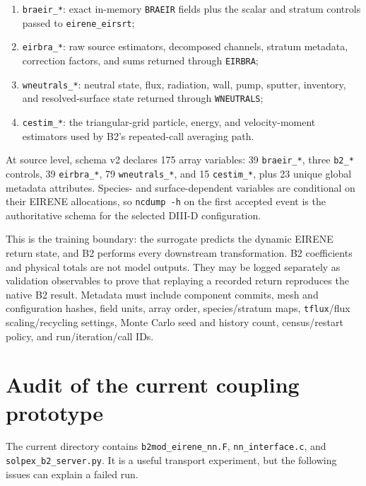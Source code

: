 \documentclass[11pt]{article}
\begin{document}
\begin{enumerate}
\item \texttt{braeir\_*}: exact in-memory \texttt{BRAEIR} fields plus the scalar and stratum controls passed to \texttt{eirene\_eirsrt};
\item \texttt{eirbra\_*}: raw source estimators, decomposed channels, stratum metadata, correction factors, and sums returned through \texttt{EIRBRA};
\item \texttt{wneutrals\_*}: neutral state, flux, radiation, wall, pump, sputter, inventory, and resolved-surface state returned through \texttt{WNEUTRALS};
\item \texttt{cestim\_*}: the triangular-grid particle, energy, and velocity-moment estimators used by B2's repeated-call averaging path.
\end{enumerate}

At source level, schema v2 declares 175 array variables: 39
\texttt{braeir\_*}, three \texttt{b2\_*} controls, 39 \texttt{eirbra\_*}, 79
\texttt{wneutrals\_*}, and 15 \texttt{cestim\_*}, plus 23 unique global
metadata attributes. Species- and surface-dependent variables are conditional
on their EIRENE allocations, so \texttt{ncdump -h} on the first accepted event
is the authoritative schema for the selected DIII-D configuration.

This is the training boundary: the surrogate predicts the dynamic EIRENE
return state, and B2 performs every downstream transformation. B2 coefficients
and physical totals are not model outputs. They may be logged separately as
validation observables to prove that replaying a recorded return reproduces
the native B2 result. Metadata must include component commits, mesh and
configuration hashes, field units, array order, species/stratum maps,
\texttt{tflux}/flux scaling/recycling settings, Monte Carlo seed and history
count, census/restart policy, and run/iteration/call IDs.

\section{Audit of the current coupling prototype}

The current directory contains \texttt{b2mod\_eirene\_nn.F}, \texttt{nn\_interface.c}, and \texttt{solpex\_b2\_server.py}. It is a useful transport experiment, but the following issues can explain a failed run.
\end{document}
